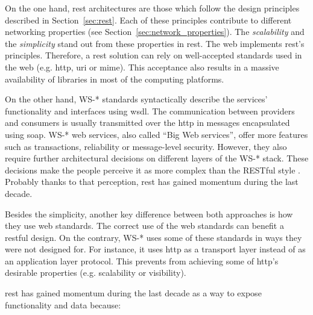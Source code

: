 On the one hand, \ac{rest} architectures are those which follow the design principles described in Section~\ref{sec:rest}.
Each of these principles contribute to different networking properties (see Section~\ref{sec:network_properties}).
The \emph{scalability} and the \emph{simplicity} stand out from these properties in \ac{rest}.
The web implements \ac{rest}'s principles.
Therefore, a \ac{rest} solution can rely on well-accepted standards used in the web (e.g. \ac{http}, \ac{uri} or \ac{mime}).
This acceptance also results in a massive availability of libraries in most of the computing platforms.


On the other hand, WS-* standards syntactically describe the services' functionality and interfaces using \ac{wsdl}.
The communication between providers and consumers is usually transmitted over the \ac{http} in messages encapsulated using \ac{soap}.
WS-* web services, also called ``Big Web services'', offer more features such as transactions, reliability or message-level security.
However, they also require further architectural decisions on different layers of the WS-* stack.
These decisions make the people perceive it as more complex than the RESTful style \citep{guinard_search_2011}.
Probably thanks to that perception, \ac{rest} has gained momentum during the last decade. %


Besides the simplicity, another key difference between both approaches is how they use web standards. %
The correct use of the web standards can benefit a \ac{rest}ful design.
On the contrary, WS-* uses some of these standards in ways they were not designed for.
For instance, it uses \ac{http} as a transport layer instead of as an application layer protocol.
This prevents from achieving some of \ac{http}'s desirable properties (e.g. scalability or visibility).


\ac{rest} has gained momentum during the last decade as a way to expose functionality and data because:



